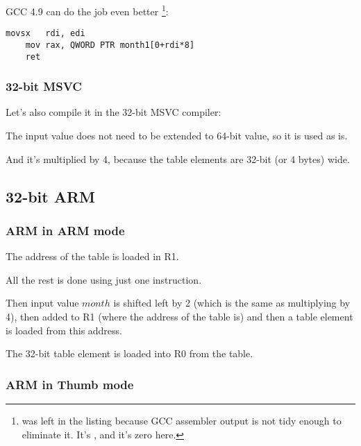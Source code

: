 \Optimizing GCC 4.9 can do the job even better
\footnote{ was left in the listing because GCC assembler output is not tidy enough to eliminate it.
It's , and it's zero here.}:

\begin{lstlisting}[caption=\Optimizing GCC 4.9 x64]
	movsx	rdi, edi
	mov	rax, QWORD PTR month1[0+rdi*8]
	ret
\end{lstlisting}

\subsubsection{32-bit MSVC}

Let's also compile it in the 32-bit MSVC compiler:



The input value does not need to be extended to 64-bit value, so it is used as is.

And it's multiplied by 4, because the table elements are 32-bit (or 4 bytes) wide.

\subsection{32-bit ARM}

\subsubsection{ARM in ARM mode}




The address of the table is loaded in R1.

All the rest is done using just one \LDR instruction.

Then input value $month$ is shifted left by 2 (which is the same as multiplying by 4), then added
to R1 (where the address of the table is) and then a table element is loaded from this address.

The 32-bit table element is loaded into R0 from the table.

\subsubsection{ARM in Thumb mode}

